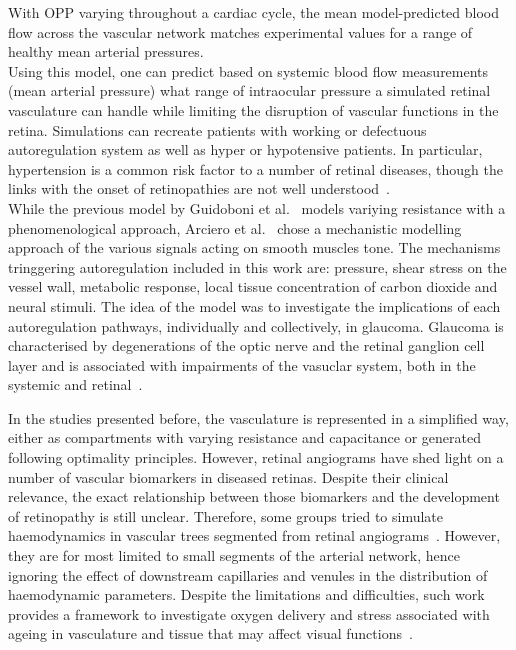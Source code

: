 \documentclass[12pt,a4paper]{article}
\begin{document}
With OPP varying throughout a cardiac cycle, the mean model-predicted blood flow across the vascular network matches experimental values for a range of healthy mean arterial pressures.\\
Using this model, one can predict based on systemic blood flow measurements (mean arterial pressure) what range of intraocular pressure a simulated retinal vasculature can handle while limiting the disruption of vascular functions in the retina.
Simulations can recreate patients with working or defectuous autoregulation system as well as hyper or hypotensive patients.
In particular, hypertension is a common risk factor to a number of retinal diseases, though the links with the onset of retinopathies are not well understood~\cite{Klein_2004, Leeman_2019}.\\

While the previous model by Guidoboni et al.~\cite{Guidoboni_2014b} models variying resistance with a phenomenological approach, Arciero et al.~\cite{Arciero_2013} chose a mechanistic modelling approach of the various signals acting on smooth muscles tone.
The mechanisms tringgering autoregulation included in this work are: pressure, shear stress on the vessel wall, metabolic response, local tissue concentration of carbon dioxide and neural stimuli.
The idea of the model was to investigate the implications of each autoregulation pathways, individually and collectively, in glaucoma.
Glaucoma is characterised by degenerations of the optic nerve and the retinal ganglion cell layer and is associated with impairments of the vasuclar system, both in the systemic and retinal~\cite{Hulsman_2007, Bonomi_2000}.

\break

In the studies presented before, the vasculature is represented in a simplified way, either as compartments with varying resistance and capacitance or generated following optimality principles.
However, retinal angiograms have shed light on a number of vascular biomarkers in diseased retinas.
Despite their clinical relevance, the exact relationship between those biomarkers and the development of retinopathy is still unclear.
Therefore, some groups tried to simulate haemodynamics in vascular trees segmented from retinal angiograms~\cite{Aletti_2016, Malek_2015, Liu_2009, Rebhan_2019}.
However, they are for most limited to small segments of the arterial network, hence ignoring the effect of downstream capillaries and venules in the distribution of haemodynamic parameters.
Despite the limitations and difficulties, such work provides a framework to investigate oxygen delivery and stress associated with ageing in vasculature and tissue that may affect visual functions~\cite{Rickett_2010,Sim_2013,Wessel_2012}.
\end{document}
